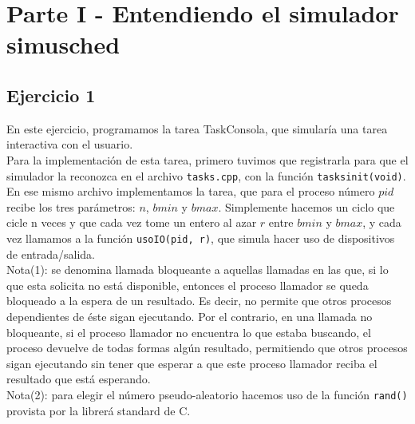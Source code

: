 \documentclass[a4paper]{article}
\begin{document}
\newpage
{}
\section{Parte I - Entendiendo el simulador simusched}

\subsection{Ejercicio 1}
En este ejercicio, programamos la tarea TaskConsola, que simular\'ia una tarea interactiva con
el usuario. \\
Para la implementaci\'on de esta tarea, primero tuvimos que registrarla para que el simulador la 
reconozca en el archivo \texttt{tasks.cpp}, con la funci\'on \texttt{tasksinit(void)}. En ese mismo archivo implementamos
la tarea, que para el proceso n\'umero $pid$ recibe los tres par\'ametros: $n$, $bmin$ y $bmax$. Simplemente
hacemos un ciclo que cicle n veces y que cada vez tome un entero al azar $r$ entre $bmin$ y 
$bmax$, y cada vez llamamos a la funci\'on \texttt{usoIO(pid, r)}, que simula hacer uso de dispositivos de
entrada/salida. \\
Nota(1): se denomina llamada bloqueante a aquellas llamadas en las que, si lo que esta  
solicita no est\'a disponible, entonces el proceso llamador se queda bloqueado a la espera de un
resultado. Es decir, no permite que otros procesos dependientes de éste sigan ejecutando. Por 
el contrario, en una llamada no bloqueante, si el proceso llamador no encuentra lo que estaba
buscando, el proceso devuelve de todas formas alg\'un resultado, permitiendo que otros procesos
sigan ejecutando sin tener que esperar a que este proceso llamador reciba el resultado que est\'a
esperando. \\
Nota(2): para elegir el n\'umero pseudo-aleatorio hacemos uso de la funci\'on \texttt{rand()} provista
por la librer\'a standard de C. \\

\newpage
\end{document}
